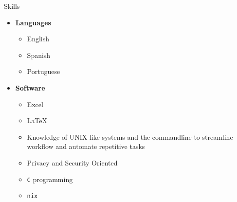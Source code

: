 \documentclass{resume} %
\begin{document}
\begin{rSection}{Skills}
    \begin{itemize}
        \item \textbf{Languages}
            \begin{itemize}
                \item English

                \item Spanish

                \item Portuguese
            \end{itemize}

        \item \textbf{Software}
            \begin{itemize}
                \item Excel

                \item \LaTeX

                \item Knowledge of UNIX-like systems and the commandline to
                    streamline workflow and automate repetitive tasks

                \item Privacy and Security Oriented

                \item \lstinline{C} programming

                \item \lstinline{nix}
            \end{itemize}
    \end{itemize}
\end{rSection}
\end{document}
